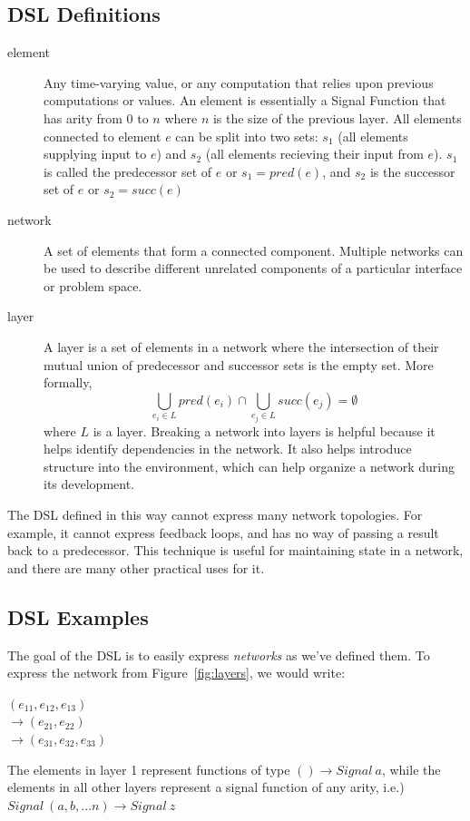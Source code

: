 \documentclass[twocolumn,11pt,english]{article}
\begin{document}
\subsection{DSL Definitions}
\begin{description}
\item[element] Any time-varying value, or any computation that relies upon previous computations or values. An element is essentially a Signal Function that has arity from 0 to $n$ where $n$ is the size of the previous layer. All elements connected to element $e$ can be split into two sets: $s_1$ (all elements supplying input to $e$) and $s_2$ (all elements recieving their input from $e$). $s_1$ is called the predecessor set of $e$ or $s_1 = pred(e)$, and $s_2$ is the successor set of $e$ or $s_2 = succ(e)$

\item[network] A set of elements that form a connected component. Multiple networks can be used to describe different unrelated components of a particular interface or problem space.

\item[layer] A layer is a set of elements in a network where the intersection of their mutual union of predecessor and successor sets is the empty set. More formally,
\begin{equation}
  \bigcup_{e_i \in L}{pred(e_i)} \cap \bigcup_{e_j \in L}{succ(e_j)} = \emptyset
\end{equation}
where $L$ is a layer. Breaking a network into layers is helpful because it helps identify dependencies in the network. It also helps introduce structure into the environment, which can help organize a network during its development. 
\end{description}
The DSL defined in this way cannot express many network topologies. For example, it cannot express feedback loops, and has no way of passing a result back to a predecessor. This technique is useful for maintaining state in a network, and there are many other practical uses for it. 

\subsection{DSL Examples}
The goal of the DSL is to easily express \textit{networks} as we've defined them. To express the network from Figure~\ref{fig:layers}, we would write:
\begin{center}
$(e_{11}, e_{12}, e_{13})$
\\ $\rightarrow (e_{21}, e_{22})$
\\ $\rightarrow (e_{31}, e_{32}, e_{33})$
\end{center}
The elements in layer 1 represent functions of type $() \rightarrow Signal~a$, while the elements in all other layers represent a signal function of any arity, i.e.) $Signal~(a, b, ... n) \rightarrow Signal~z$
\end{document}
